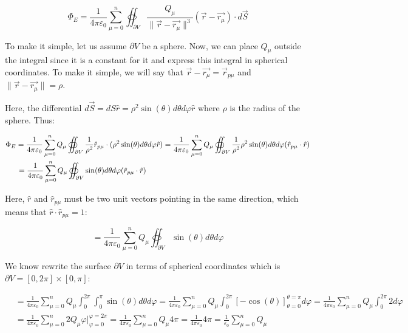 \documentclass[12pt]{article}
\begin{document}
	\[
		\Phi_E
		= \frac{1}{4 \pi \varepsilon_0} \sum_{\mu = 0}^{n} \oiint_{\partial V} \frac{Q_\mu}{\|\vec{r}-\vec{r_\mu}\|^3}(\vec{r} - \vec{r_\mu}) \cdot d\vec{S}
	\]
	
	To make it simple, let us assume $\partial V$ be a sphere.
	Now, we can place $Q_\mu$ outside the integral since it is a constant for it and express this integral in spherical coordinates. To make it simple, we will say that $\vec{r} - \vec{r_\mu} = \vec{r}_{p\mu}$ and $\|\vec{r} - \vec{r_\mu}\| = \rho$.
	
	Here, the differential $d\vec{S} = dS\hat{r} = \rho^2 \sin(\theta) d\theta d\varphi \hat{r}$ where $\rho$ is the radius of the sphere. Thus:
	
	\[
		\begin{aligned}
			& \Phi_E
			= \frac{1}{4 \pi \varepsilon_0} \sum_{\mu = 0}^{n} Q_\mu \oiint_{\partial V} \frac{1}{\rho^2} \hat{r}_{p\mu} \cdot (\rho^2 \sin(\theta) d\theta d\varphi \hat{r})
			= \frac{1}{4 \pi \varepsilon_0} \sum_{\mu = 0}^{n} Q_\mu \oiint_{\partial V} \frac{1}{\rho^2} \rho^2 \sin(\theta) d\theta d\varphi (\hat{r}_{p\mu} \cdot \hat{r})
			\\
			& \hspace{1.5em} = \frac{1}{4 \pi \varepsilon_0} \sum_{\mu = 0}^{n} Q_\mu \oiint_{\partial V} \sin(\theta) d\theta d\varphi (\hat{r}_{p\mu} \cdot \hat{r})
		\end{aligned}
	\]
	
	Here, $\hat{r}$ and $\hat{r}_{p\mu}$ must be two unit vectors pointing in the same direction, which means that $\hat{r} \cdot \hat{r}_{p\mu} = 1$:
	
	\[
		= \frac{1}{4 \pi \varepsilon_0} \sum_{\mu = 0}^{n} Q_\mu \oiint_{\partial V} \sin(\theta) d\theta d\varphi
	\]
	
	We know rewrite the surface $\partial V$ in terms of spherical coordinates which is $\partial V = [0, 2\pi] \times [0, \pi]$:
	
	\[
		\begin{aligned}
			& = \frac{1}{4 \pi \varepsilon_0} \sum_{\mu = 0}^{n} Q_\mu \int_{0}^{2\pi} \int_{0}^{\pi} \sin(\theta) d\theta d\varphi
			= \frac{1}{4 \pi \varepsilon_0} \sum_{\mu = 0}^{n} Q_\mu \int_{0}^{2\pi} [-\cos(\theta)]_{\theta = 0}^{\theta = \pi} d\varphi
			= \frac{1}{4 \pi \varepsilon_0} \sum_{\mu = 0}^{n} Q_\mu \int_{0}^{2\pi} 2 d\varphi
			\\
			& = \frac{1}{4 \pi \varepsilon_0} \sum_{\mu = 0}^{n} 2Q_\mu \varphi|_{\varphi = 0}^{\varphi = 2\pi}
			= \frac{1}{4 \pi \varepsilon_0} \sum_{\mu = 0}^{n} Q_\mu 4\pi
			= \frac{1}{4 \pi \varepsilon_0} 4\pi  
			= \frac{1}{\varepsilon_0} \sum_{\mu = 0}^{n} Q_\mu
		\end{aligned}
	\]
	
\end{document}
